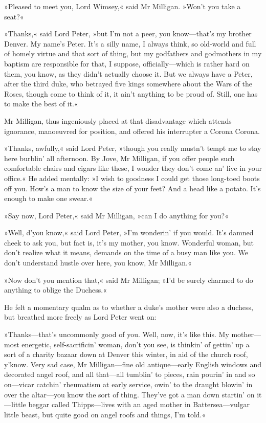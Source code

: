 »Pleased to meet you, Lord Wimsey,« said Mr Milligan. »Won't you take a seat?«

»Thanks,« said Lord Peter, »but I'm not a peer, you know\allowbreak---\allowbreak that's my brother Denver. My name's Peter. It's a silly name, I always think, so old-world and full of homely virtue and that sort of thing, but my godfathers and godmothers in my baptism are responsible for that, I suppose, officially\allowbreak---\allowbreak which is rather hard on them, you know, as they didn't actually choose it. But we always have a Peter, after the third duke, who betrayed five kings somewhere about the Wars of the Roses, though come to think of it, it ain't anything to be proud of. Still, one has to make the best of it.«

Mr Milligan, thus ingeniously placed at that disadvantage which attends ignorance, manoeuvred for position, and offered his interrupter a Corona Corona.

»Thanks, awfully,« said Lord Peter, »though you really mustn't tempt me to stay here burblin' all afternoon. By Jove, Mr Milligan, if you offer people such comfortable chairs and cigars like these, I wonder they don't come an' live in your office.« He added mentally: »I wish to goodness I could get those long-toed boots off you. How's a man to know the size of your feet? And a head like a potato. It's enough to make one swear.«

»Say now, Lord Peter,« said Mr Milligan, »can I do anything for you?«

»Well, d'you know,« said Lord Peter, »I'm wonderin' if you would. It's damned cheek to ask you, but fact is, it's my mother, you know. Wonderful woman, but don't realize what it means, demands on the time of a busy man like you. We don't understand hustle over here, you know, Mr Milligan.«

»Now don't you mention that,« said Mr Milligan; »I'd be surely charmed to do anything to oblige the Duchess.«

He felt a momentary qualm as to whether a duke's mother were also a duchess, but breathed more freely as Lord Peter went on:

»Thanks\allowbreak---\allowbreak that's uncommonly good of you. Well, now, it's like this. My mother\allowbreak---\allowbreak most energetic, self-sacrificin' woman, don't you see, is thinkin' of gettin' up a sort of a charity bazaar down at Denver this winter, in aid of the church roof, y'know. Very sad case, Mr Milligan\allowbreak---\allowbreak fine old antique\allowbreak---\allowbreak early English windows and decorated angel roof, and all that\allowbreak---\allowbreak all tumblin' to pieces, rain pourin' in and so on\allowbreak---\allowbreak vicar catchin' rheumatism at early service, owin' to the draught blowin' in over the altar\allowbreak---\allowbreak you know the sort of thing. They've got a man down startin' on it\allowbreak---\allowbreak little beggar called Thipps\allowbreak---\allowbreak lives with an aged mother in Battersea\allowbreak---\allowbreak vulgar little beast, but quite good on angel roofs and things, I'm told.«

